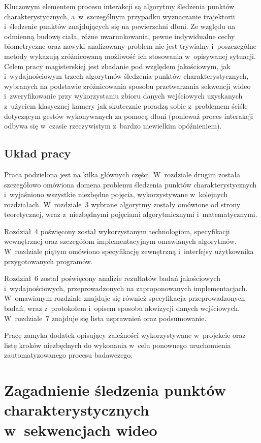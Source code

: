     Kluczowym elementem procesu interakcji są algorytmy śledzenia punktów charakterystycznych, a~w~szczególnym przypadku wyznaczanie trajektorii i~śledzenie punktów znajdujących się na powierzchni dłoni. Ze względu na odmienną budowę ciała, różne uwarunkowania, pewne indywidualne cechy biometryczne oraz nawyki analizowany problem nie jest trywialny i~poszczególne metody wykazują zróżnicowaną możliwość ich stosowania w~opisywanej sytuacji. Celem pracy magisterskiej jest zbadanie pod względem jakościowym, jak i~wydajnościowym trzech algorytmów śledzenia punktów charakterystycznych, wybranych na podstawie zróżnicowania sposobu przetwarzania sekwencji wideo i~zweryfikowanie przy wykorzystaniu zbioru danych wejściowych uzyskanych z~użyciem klasycznej kamery jak skutecznie poradzą sobie z~problemem ściśle dotyczącym gestów wykonywanych za pomocą dłoni (ponieważ proces interakcji odbywa się w~czasie rzeczywistym z~bardzo niewielkim opóźnieniem).

  \section{Układ pracy}\label{Section_Layout}

    Praca podzielona jest na kilka głównych części. W~rozdziale drugim została szczegółowo omówiona domena problemu śledzenia punktów charakterystycznych i~wyjaśniono wszystkie niezbędne pojęcia, wykorzystywane w~kolejnych rozdziałach. W~rozdziale~3 wybrane algorytmy zostały omówione od strony teoretycznej, wraz z~niezbędnymi pojęciami algorytmicznymi i~matematycznymi.

    Rozdział~4 poświęcony został wykorzystanym technologiom, specyfikacji wewnętrznej oraz szczegółom implementacyjnym omawianych algorytmów. W~rozdziale piątym omówiono specyfikację zewnętrzną i~interfejsy użytkownika przygotowanych programów.

    Rozdział~6 został poświęcony analizie rezultatów badań jakościowych i~wydajnościowych, przeprowadzonych na zaproponowanych implementacjach. W~omawianym rozdziale znajduje się również specyfikacja przeprowadzonych badań, wraz z~protokołem i~opisem sposobu akwizycji danych wejściowych. W~rozdziale~7 znajduje się lista usprawnień oraz podsumowanie.

    Pracę zamyka dodatek opisujący zależności wykorzystywane w~projekcie oraz listę kroków niezbędnych do wykonania w~celu ponownego uruchomienia zautomatyzowanego procesu badawczego.

\chapter{Zagadnienie śledzenia punktów charakterystycznych w~sekwencjach wideo}\label{Chapter_TrackingDomain}

